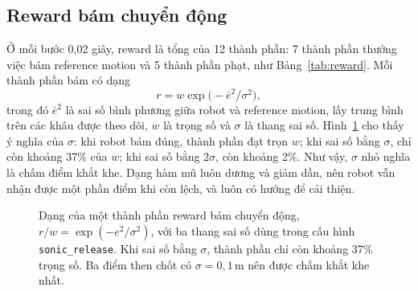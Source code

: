 \documentclass[12pt,a4paper,oneside]{report}
\newcommand{\code}[1]{\texttt{#1}}
\begin{document}
\subsection{Reward bám chuyển động}
\label{sec:reward_terms}

Ở mỗi bước 0,02 giây, reward là tổng của 12 thành phần: 7 thành phần thưởng việc bám reference motion và 5 thành phần phạt, như Bảng~\ref{tab:reward}. Mỗi thành phần bám có dạng
\begin{equation}
r = w \exp\!\big(-\bar e^{2} / \sigma^{2}\big),
\label{eq:reward_exp}
\end{equation}
trong đó $\bar e^{2}$ là sai số bình phương giữa robot và reference motion, lấy trung bình trên các khâu được theo dõi, $w$ là trọng số và $\sigma$ là thang sai số. Hình~\ref{fig:reward_curve} cho thấy ý nghĩa của $\sigma$: khi robot bám đúng, thành phần đạt trọn $w$; khi sai số bằng $\sigma$, chỉ còn khoảng 37\% của $w$; khi sai số bằng $2\sigma$, còn khoảng 2\%. Như vậy, $\sigma$ nhỏ nghĩa là chấm điểm khắt khe. Dạng hàm mũ luôn dương và giảm dần, nên robot vẫn nhận được một phần điểm khi còn lệch, và luôn có hướng để cải thiện.

\begin{figure}[htbp]
\centering
{}
\caption[Dạng của thành phần reward bám chuyển động]{Dạng của một thành phần reward bám chuyển động, $r / w = \exp(-e^2/\sigma^2)$, với ba thang sai số dùng trong cấu hình \code{sonic\_release}. Khi sai số bằng $\sigma$, thành phần chỉ còn khoảng 37\% trọng số. Ba điểm then chốt có $\sigma = 0{,}1$\,m nên được chấm khắt khe nhất.}
\label{fig:reward_curve}
\end{figure}
\end{document}
